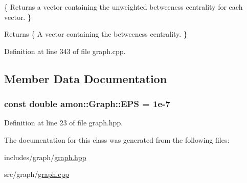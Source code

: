 \{ Returns a vector containing the unweighted betweeness centrality for each vector. \} 

\begin{DoxyReturn}{Returns}
\{ A vector containing the betweeness centrality. \} 
\end{DoxyReturn}


Definition at line 343 of file graph.\-cpp.



\subsection{Member Data Documentation}
\hypertarget{classamon_1_1_graph_a1bddebc6360d5154a86dbd75856b6a6c}{
\subsubsection[{E\-P\-S}]{\setlength{\rightskip}{0pt plus 5cm}const double amon\-::\-Graph\-::\-E\-P\-S = 1e-\/7\hspace{0.3cm}{\ttfamily [static]}}}\label{classamon_1_1_graph_a1bddebc6360d5154a86dbd75856b6a6c}


Definition at line 23 of file graph.\-hpp.



The documentation for this class was generated from the following files\-:\begin{DoxyCompactItemize}
\item 
includes/graph/\hyperlink{graph_8hpp}{graph.\-hpp}\item 
src/graph/\hyperlink{graph_8cpp}{graph.\-cpp}\end{DoxyCompactItemize}
